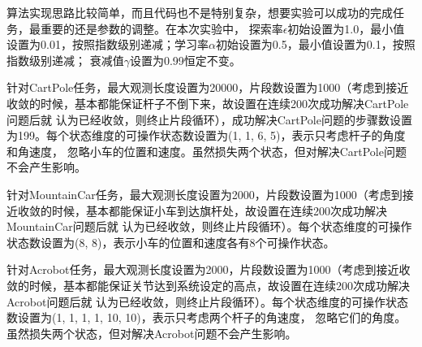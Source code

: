 \documentclass[a4paper,UTF8]{article}
\theoremstyle{definition}
\begin{document}
算法实现思路比较简单，而且代码也不是特别复杂，想要实验可以成功的完成任务，最重要的还是参数的调整。在本次实验中，
探索率$\epsilon$初始设置为1.0，最小值设置为0.01，按照指数级别递减；学习率$\alpha$初始设置为0.5，最小值设置为0.1，按照指数级别递减；
衰减值$\gamma$设置为0.99恒定不变。

针对CartPole任务，最大观测长度设置为20000，片段数设置为1000（考虑到接近收敛的时候，基本都能保证杆子不倒下来，故设置在连续200次成功解决CartPole问题后就
认为已经收敛，则终止片段循环），成功解决CartPole问题的步骤数设置为199。每个状态维度的可操作状态数设置为(1, 1, 6, 5)，表示只考虑杆子的角度和角速度，
忽略小车的位置和速度。虽然损失两个状态，但对解决CartPole问题不会产生影响。

针对MountainCar任务，最大观测长度设置为2000，片段数设置为1000（考虑到接近收敛的时候，基本都能保证小车到达旗杆处，故设置在连续200次成功解决MountainCar问题后就
认为已经收敛，则终止片段循环）。每个状态维度的可操作状态数设置为(8, 8)，表示小车的位置和速度各有8个可操作状态。

针对Acrobot任务，最大观测长度设置为2000，片段数设置为1000（考虑到接近收敛的时候，基本都能保证关节达到系统设定的高点，故设置在连续200次成功解决Acrobot问题后就
认为已经收敛，则终止片段循环）。每个状态维度的可操作状态数设置为(1, 1, 1, 1, 10, 10)，表示只考虑两个杆子的角速度，
忽略它们的角度。虽然损失两个状态，但对解决Acrobot问题不会产生影响。
\end{document}
